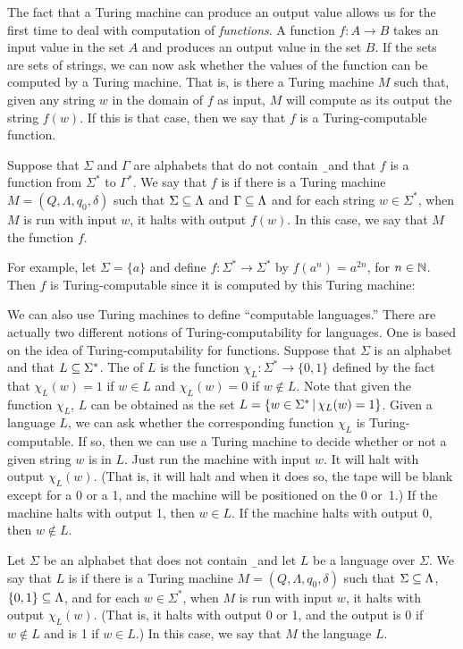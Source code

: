 The fact that a Turing machine can produce an output value allows us
for the first time to deal with computation of \textit{functions}.
A function $f\colon A\to B$ takes an input value in the set $A$
and produces an output value in the set $B$.  If the sets are sets
of strings, we can now ask whether the values of the function can
be computed by a Turing machine.  That is, is there a Turing machine $M$
such that, given any string $w$ in the domain of $f$ as input,
$M$ will compute as its output the string $f(w)$.  If this is
that case, then we say that $f$ is a Turing-computable function.
\begin{definition} Suppose
that $\Sigma$ and $\Gamma$ are alphabets that do not contain \b\ and that
$f$ is a function from $\Sigma^*$ to $\Gamma^*$.  We say that
$f$ is  if there is a Turing machine
$M=(Q,\Lambda,q_0,\delta)$ such that $\Sigma\subseteq\Lambda$ and $\Gamma\subseteq\Lambda$
and for each string $w\in\Sigma^*$, when $M$ is run with input $w$,
it halts with output $f(w)$.  In this case, we say that $M$
 the function $f$.
\end{definition}
\noindent For example, let $\Sigma=\{a\}$ and define $f\colon\Sigma^*\to\Sigma^*$
by $f(a^n)=a^{2n}$, for $n\in{\mathbb N}$.  Then $f$ is Turing-computable
since it is computed by this Turing machine:

\medbreak

\breakSixByNine

\centerline{}
\medbreak

We can also use Turing machines to define ``computable languages.''
There are actually two different notions of Turing-computability
for languages.  One is based on the idea of Turing-computability
for functions.  Suppose that $\Sigma$ is an alphabet and that
$L\subseteq\Sigma^*$.  The  of $L$
is the function $\chi_L\colon\Sigma^*\to\{0,1\}$ defined
by the fact that $\chi_L(w)=1$ if $w\in L$ and $\chi_L(w)=0$
if $w\not\in L$.  Note that given the function $\chi_L$,
$L$ can be obtained as the set $L=\{w\in\Sigma^*\,|\, \chi_L(w)=1\}$.
Given a language $L$, we can ask whether the corresponding function
$\chi_L$ is Turing-computable.  If so, then we can use a Turing
machine to decide whether or not a given string $w$ is in $L$.
Just run the machine with input $w$.  It will halt with output $\chi_L(w)$.
(That is, it will halt and when it does so, the tape will be blank except for
a 0 or a 1, and the machine will be positioned on the 0 or~1.)
If the machine halts with output 1, then $w\in L$.  If the machine halts with
output 0, then $w\not\in L$.
\begin{definition}
Let $\Sigma$ be an alphabet that does not contain \b\ and let $L$ be a language over $\Sigma$.
We say that $L$ is  if there is a Turing machine
$M=(Q,\Lambda,q_0,\delta)$ such that $\Sigma\subseteq\Lambda$, $\{0,1\}\subseteq\Lambda$,
and for each $w\in\Sigma^*$, when $M$ is run with input $w$, it halts
with output $\chi_L(w)$.  (That is, it halts with output 0 or 1, and
the output is 0 if $w\not\in L$ and is 1 if $w\in L$.)  In this case,
we say that $M$  the language $L$.
\end{definition}


